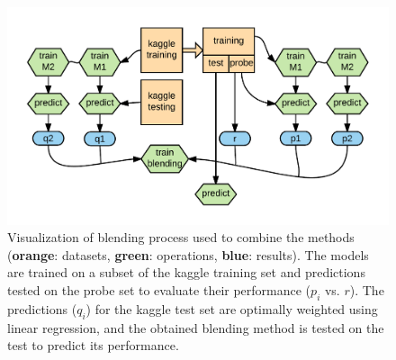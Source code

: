 \begin{figure}[htbp]
  \centering
  \includegraphics[width=\columnwidth]{figures/blending2.png}
  \vspace{-3mm}
  \caption{Visualization of blending process used to combine the
  methods (\textbf{orange}: datasets, 
  \textbf{green}: operations, \textbf{blue}: results).
  The models are trained on a subset of the kaggle training set and 
  predictions tested on the probe set to evaluate their performance 
  ($p_i$ vs. $r$). The predictions ($q_i$) for the kaggle test set
  are optimally weighted using linear regression, and the obtained blending method is tested on the test
  to predict its performance.}
  \label{fig:blending}
\end{figure}



